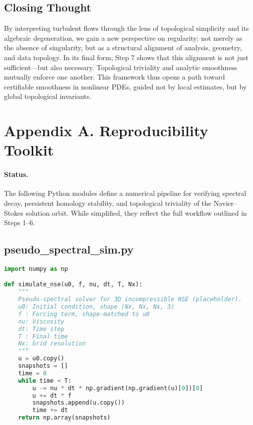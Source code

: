 \documentclass[11pt]{article}
\theoremstyle{definition}
\begin{document}
\subsection*{Closing Thought}

By interpreting turbulent flows through the lens of topological simplicity and its algebraic degeneration, we gain a new perspective on regularity: not merely as the absence of singularity, but as a structural alignment of analysis, geometry, and data topology. In its final form, Step 7 shows that this alignment is not just sufficient—but also necessary. Topological triviality and analytic smoothness mutually enforce one another. This framework thus opens a path toward certifiable smoothness in nonlinear PDEs, guided not by local estimates, but by global topological invariants.




\section{Appendix A. Reproducibility Toolkit}
\label{sec:appendixA}

\paragraph{Status.}
The following Python modules define a numerical pipeline for verifying spectral decay, persistent homology stability, and topological triviality of the Navier--Stokes solution orbit. While simplified, they reflect the full workflow outlined in Steps 1–6.

\subsection*{pseudo\_spectral\_sim.py}
\begin{lstlisting}[language=Python]
import numpy as np

def simulate_nse(u0, f, nu, dt, T, Nx):
    """
    Pseudo-spectral solver for 3D incompressible NSE (placeholder).
    u0: Initial condition, shape (Nx, Nx, Nx, 3)
    f : Forcing term, shape-matched to u0
    nu: Viscosity
    dt: Time step
    T : Final time
    Nx: Grid resolution
    """
    u = u0.copy()
    snapshots = []
    time = 0
    while time < T:
        u -= nu * dt * np.gradient(np.gradient(u)[0])[0]
        u += dt * f
        snapshots.append(u.copy())
        time += dt
    return np.array(snapshots)
\end{lstlisting}
\end{document}
